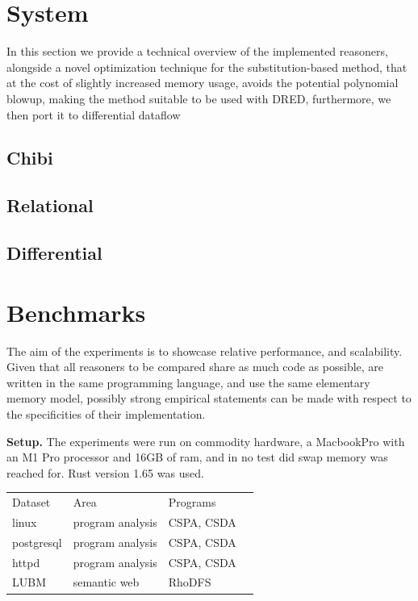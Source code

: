 \documentclass[sigconf,screen,review,natbib]{acmart}
\theoremstyle{definition}
\begin{document}
\section{System}

In this section we provide a technical overview of the implemented reasoners, alongside a novel optimization
technique for the substitution-based method, that at the cost of slightly increased memory usage, avoids the
potential polynomial blowup, making the method suitable to be used with DRED, furthermore, we then port it to
differential dataflow

\subsection{Chibi}

\subsection{Relational}

\subsection{Differential}

\section{Benchmarks}

The aim of the experiments is to showcase relative performance, and scalability. Given that all reasoners to be compared share as much code as possible, are written in the same
programming language, and use the same elementary memory model, possibly strong empirical statements can be made with respect to the specificities of their implementation.

\textbf{Setup.} The experiments were run on commodity hardware, a MacbookPro with an M1 Pro processor and 16GB of ram, and in no test did swap memory was reached for.
Rust version 1.65 was used.

\begin{table}[]
	\begin{tabular}{llll}
		Dataset    & Area             & Programs   \\
		linux      & program analysis & CSPA, CSDA \\
		postgresql & program analysis & CSPA, CSDA \\
		httpd      & program analysis & CSPA, CSDA \\
		LUBM       & semantic web     & RhoDFS
	\end{tabular}
	\label{table:datasets}
\end{table}
\end{document}
